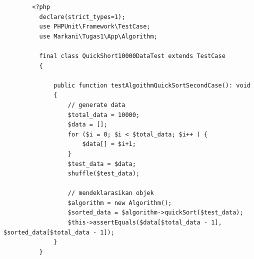 \documentclass[12pt,a4paper,oneside]{report}
\begin{document}
      \begin{lstlisting}
        <?php
          declare(strict_types=1);
          use PHPUnit\Framework\TestCase;
          use Markani\Tugas1\App\Algorithm;

          final class QuickShort10000DataTest extends TestCase
          {

              public function testAlgoithmQuickSortSecondCase(): void
              {
                  // generate data
                  $total_data = 10000;
                  $data = [];
                  for ($i = 0; $i < $total_data; $i++ ) {
                      $data[] = $i+1;
                  }
                  $test_data = $data;
                  shuffle($test_data);

                  // mendeklarasikan objek
                  $algorithm = new Algorithm();
                  $sorted_data = $algorithm->quickSort($test_data);
                  $this->assertEquals($data[$total_data - 1], $sorted_data[$total_data - 1]);
              }
          }
      \end{lstlisting}

      
\end{document}
